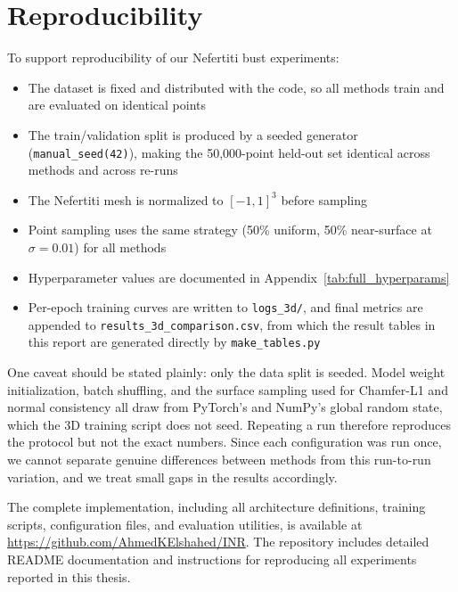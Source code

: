 \section{Reproducibility}

To support reproducibility of our Nefertiti bust experiments:
\begin{itemize}
    \item The dataset is fixed and distributed with the code, so all methods train and are evaluated on identical points
    \item The train/validation split is produced by a seeded generator (\texttt{manual\_seed(42)}), making the 50,000-point held-out set identical across methods and across re-runs
    \item The Nefertiti mesh is normalized to $[-1, 1]^3$ before sampling
    \item Point sampling uses the same strategy (50\% uniform, 50\% near-surface at $\sigma = 0.01$) for all methods
    \item Hyperparameter values are documented in Appendix~\ref{tab:full_hyperparams}
    \item Per-epoch training curves are written to \texttt{logs\_3d/}, and final metrics are appended to \texttt{results\_3d\_comparison.csv}, from which the result tables in this report are generated directly by \texttt{make\_tables.py}
\end{itemize}

One caveat should be stated plainly: only the data split is seeded. Model weight initialization, batch shuffling, and the surface sampling used for Chamfer-L1 and normal consistency all draw from PyTorch's and NumPy's global random state, which the 3D training script does not seed. Repeating a run therefore reproduces the protocol but not the exact numbers. Since each configuration was run once, we cannot separate genuine differences between methods from this run-to-run variation, and we treat small gaps in the results accordingly.

The complete implementation, including all architecture definitions, training scripts, configuration files, and evaluation utilities, is available at \url{https://github.com/AhmedKElshahed/INR}. The repository includes detailed README documentation and instructions for reproducing all experiments reported in this thesis.